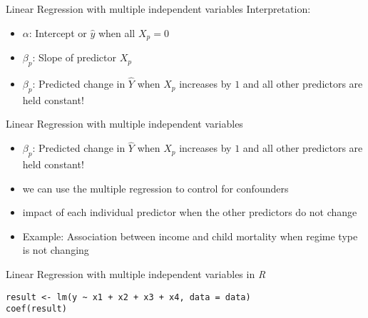 \documentclass[presentation]{beamer}
\begin{document}
\begin{frame}[label={sec:org6037d05}]{Linear Regression with multiple independent variables}
Interpretation:

\begin{itemize}
\item \(\alpha\): Intercept or \(\hat{y}\) when all \(X_{p} = 0\)
\end{itemize}

\pause

\begin{itemize}
\item \(\beta_{p}\): Slope of predictor \(X_{p}\)
\end{itemize}

\pause

\begin{itemize}
\item \(\beta_{p}\): Predicted change in \(\hat{Y}\) when \(X_{p}\) increases by \(1\) \alert{and} all other predictors \alert{are held constant}!
\end{itemize}
\end{frame}



\begin{frame}[label={sec:org139c7b4}]{Linear Regression with multiple independent variables}
\begin{itemize}
\item \(\beta_{p}\): Predicted change in \(\hat{Y}\) when \(X_{p}\) increases by \(1\) \alert{and} all other predictors \alert{are held constant}!

\item we can use the multiple regression to \alert{control for confounders}
\end{itemize}

\pause

\begin{itemize}
\item impact of each individual predictor when the other predictors do not change

\item Example: Association between income and child mortality when regime type is not changing
\end{itemize}
\end{frame}

\begin{frame}[fragile,label={sec:org9bbe5f7}]{Linear Regression with multiple independent variables in \emph{R}}
 \begin{verbatim}
result <- lm(y ~ x1 + x2 + x3 + x4, data = data)
coef(result)
\end{verbatim}
\end{frame}
\end{document}
